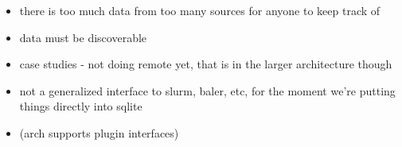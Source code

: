 \begin{itemize}
\item there is too much data from too many sources for anyone to keep track of

\item data must be discoverable 

\item case studies - not doing remote yet, that is in the larger architecture though

\item not a generalized interface to slurm, baler, etc, for the moment we're putting things directly into sqlite

\item (arch supports plugin interfaces)


\end{itemize}











